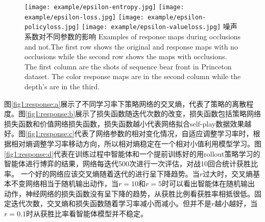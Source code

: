 \begin{figure}[!htpb]
	\centering
	{\texttt{[image: example/epsilon-entropy.jpg]}}
	\hspace{0.5em}
	{\texttt{[image: example/epsilon-loss.jpg]}}
	\newline
	\centering
	{\texttt{[image: example/epsilon-policyloss.jpg]}}
	\hspace{0.5em}
	{\texttt{[image: example/epsilon-valueloss.jpg]}}
	\bicaption
	{噪声系数对不同参数的影响}
	{Examples of response maps during occlusions and not.The first row shows the original and response maps with no occlusions while the second row shows the maps with occlusions. The first column are the shots of sequence bear front in Princeton dataset. The color response maps are in the second column while the depth’s are in the third.}
	\label{fig1response}
\end{figure}
图\ref{fig1:response:a}展示了不同学习率下策略网络的交叉熵，代表了策略的离散程度。图\ref{fig1:response:b}展示了损失函数随迭代次数的改变，损失函数包括策略网络损失函数和价值网络损失函数，损失函数越小代表网络拟合self-play数据效果越好。图\ref{fig1:response:c}代表了网络参数的相对变化情况，自适应调整学习率时，根据相对熵调整学习率移动方向，所以相对熵稳定在一个相对小值利用模型学习。图\ref{fig1:response:d}代表在训练过程中智能体和一个提前训练好的用rollout策略学习的智能体进行博弈的结果，网络每迭代500次进行一次评估，对战10回合统计获胜比率。
一个好的网络应该交叉熵随着迭代的进行呈下降趋势。当$r$过大时，交叉熵基本不变网络相当于随机输出动作，当$r=10$和$r=5$时可以看出智能体在随机输出动作，神经网络的损失函数没有呈下降的趋势，从获胜比例看获胜率相抵很低。固定迭代次数，交叉熵和损失函数随着学习率减小而减小。但并不是$r$越小越好，当$r=0.1$时从获胜比率看智能体模型并不稳定。

